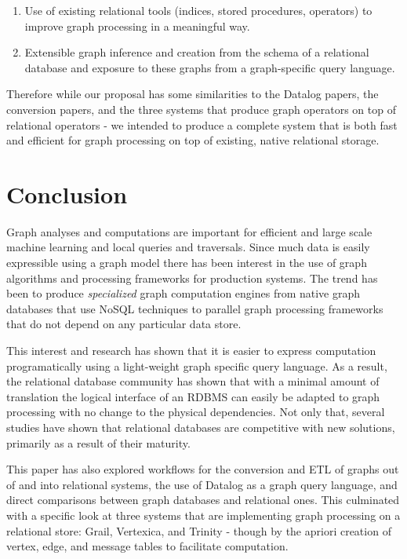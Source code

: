 \documentclass[11pt,letterpaper]{article}
\begin{document}
\begin{enumerate}
	\item Use of existing relational tools (indices, stored procedures, operators) to improve graph processing in a meaningful way.
	\item Extensible graph inference and creation from the schema of a relational database and exposure to these graphs from a graph-specific query language.
\end{enumerate}

Therefore while our proposal has some similarities to the Datalog papers, the conversion papers, and the three systems that produce graph operators on top of relational operators - we intended to produce a complete system that is both fast and efficient for graph processing on top of existing, native relational storage.

\section*{Conclusion}

Graph analyses and computations are important for efficient and large scale machine learning and local queries and traversals. Since much data is easily expressible using a graph model there has been interest in the use of graph algorithms and processing frameworks for production systems. The trend has been to produce \textit{specialized} graph computation engines from native graph databases that use NoSQL techniques to parallel graph processing frameworks that do not depend on any particular data store.

This interest and research has shown that it is easier to express computation programatically using a light-weight graph specific query language. As a result, the relational database community has shown that with a minimal amount of translation the logical interface of an RDBMS can easily be adapted to graph processing with no change to the physical dependencies. Not only that, several studies have shown that relational databases are competitive with new solutions, primarily as a result of their maturity.

This paper has also explored workflows for the conversion and ETL of graphs out of and into relational systems, the use of Datalog as a graph query language, and direct comparisons between graph databases and relational ones. This culminated with a specific look at three systems that are implementing graph processing on a relational store: Grail, Vertexica, and Trinity - though by the apriori creation of vertex, edge, and message tables to facilitate computation.
\end{document}

